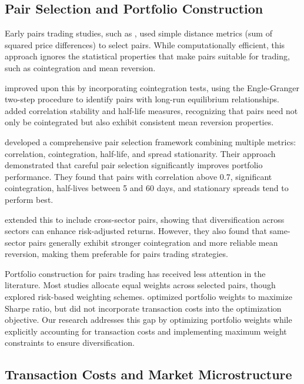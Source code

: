 \documentclass[12pt]{article}
\begin{document}
\subsection{Pair Selection and Portfolio Construction}

Early pairs trading studies, such as \citet{gatev2006pairs}, used simple distance metrics (sum of squared price differences) to select pairs. While computationally efficient, this approach ignores the statistical properties that make pairs suitable for trading, such as cointegration and mean reversion.

\citet{do2006pairs} improved upon this by incorporating cointegration tests, using the Engle-Granger two-step procedure to identify pairs with long-run equilibrium relationships. \citet{rad2016pairs} added correlation stability and half-life measures, recognizing that pairs need not only be cointegrated but also exhibit consistent mean reversion properties.

\citet{caldeira2013pairs} developed a comprehensive pair selection framework combining multiple metrics: correlation, cointegration, half-life, and spread stationarity. Their approach demonstrated that careful pair selection significantly improves portfolio performance. They found that pairs with correlation above 0.7, significant cointegration, half-lives between 5 and 60 days, and stationary spreads tend to perform best.

\citet{liu2017pairs} extended this to include cross-sector pairs, showing that diversification across sectors can enhance risk-adjusted returns. However, they also found that same-sector pairs generally exhibit stronger cointegration and more reliable mean reversion, making them preferable for pairs trading strategies.

Portfolio construction for pairs trading has received less attention in the literature. Most studies allocate equal weights across selected pairs, though \citet{caldeira2013pairs} explored risk-based weighting schemes. \citet{avellaneda2010statistical} optimized portfolio weights to maximize Sharpe ratio, but did not incorporate transaction costs into the optimization objective. Our research addresses this gap by optimizing portfolio weights while explicitly accounting for transaction costs and implementing maximum weight constraints to ensure diversification.

\subsection{Transaction Costs and Market Microstructure}
\end{document}

